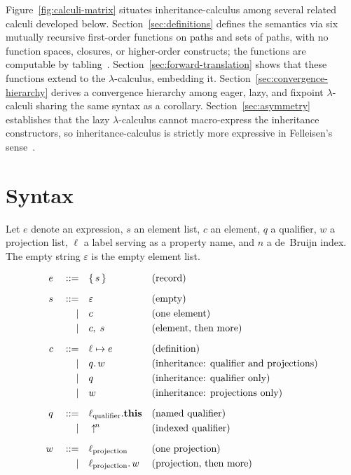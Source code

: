 Figure~\ref{fig:calculi-matrix} situates inheritance-calculus among
several related calculi developed below.
Section~\ref{sec:definitions} defines the semantics via six
mutually recursive first-order functions on paths and sets of paths,
with no function spaces, closures, or higher-order constructs;
the functions are computable by
tabling~\cite{tamaki1986-tabled-resolution}.
Section~\ref{sec:forward-translation} shows that
these functions extend to the $\lambda$-calculus, embedding it.
Section~\ref{sec:convergence-hierarchy} derives a convergence hierarchy
among eager, lazy, and fixpoint
$\lambda$-calculi sharing the same syntax as a corollary.
Section~\ref{sec:asymmetry} establishes that the lazy
$\lambda$-calculus cannot macro-express the inheritance constructors,
so inheritance-calculus is strictly more expressive in
Felleisen's sense~\cite{felleisen1991-expressive-power}.

\section{Syntax}
\label{sec:syntax}

Let $e$ denote an expression, $s$ an element list, $c$ an element,
$q$ a qualifier, $w$ a projection list, $\ell$ a label serving as a
property name, and $n$ a de~Bruijn index.
The empty string $\varepsilon$ is the empty element list.

\begin{align*}
  e \quad ::= \quad & \{\, s \,\}
  && \text{(record)} \\[6pt]
  s \quad ::= \quad & \varepsilon
  && \text{(empty)} \\*
  \mid\quad & c
  && \text{(one element)} \\*
  \mid\quad & c,\; s
  && \text{(element, then more)} \\[6pt]
  c \quad ::= \quad & \ell \mapsto e
  && \text{(definition)} \\*
  \mid\quad & q.\, w
  && \text{(inheritance: qualifier and projections)} \\*
  \mid\quad & q
  && \text{(inheritance: qualifier only)} \\*
  \mid\quad & w
  && \text{(inheritance: projections only)} \\[6pt]
  q \quad ::= \quad & \ell_{\mathrm{qualifier}}.\mathbf{this}
  && \text{(named qualifier)} \\*
  \mid\quad & \uparrow^{\!n}
  && \text{(indexed qualifier)} \\[6pt]
  w \quad ::= \quad & \ell_{\mathrm{projection}}
  && \text{(one projection)} \\*
  \mid\quad & \ell_{\mathrm{projection}}.\, w
  && \text{(projection, then more)}
\end{align*}

